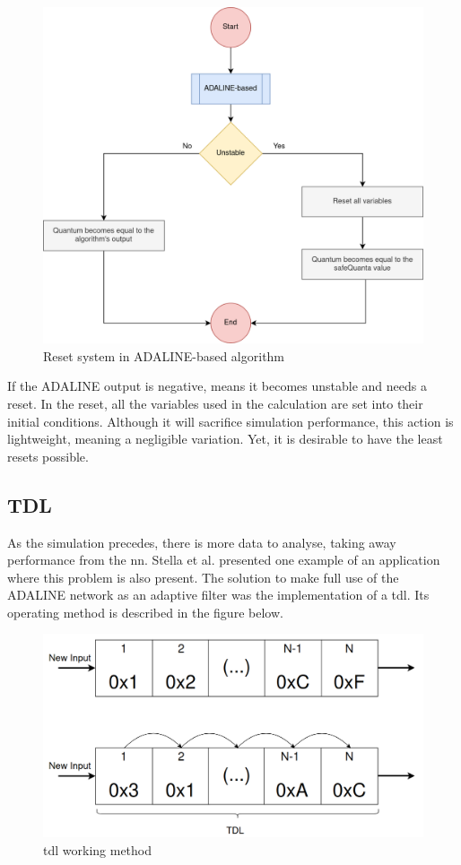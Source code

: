 \begin{figure}[H]
	\centering
 	\includegraphics[width=0.6\linewidth]{Images/ResetSystemADALINE.png}
 	\caption{Reset system in ADALINE-based algorithm}
	 \label{fig_ResetSystemADALINE}
\end{figure}

If the ADALINE output is negative, means it becomes unstable and needs a reset. In the reset, all the variables used in the calculation are set 
into their initial conditions. Although it will sacrifice simulation performance, this action is lightweight, meaning a negligible variation. 
Yet, it is desirable to have the least resets possible.

\subsection{TDL}

As the simulation precedes, there is more data to analyse, taking away performance from the \gls{nn}. Stella et al. \cite{noiseCancelingADALINE} 
presented one example of an application where this problem is also present. The solution to make full use of the ADALINE network as an adaptive 
filter was the implementation of a \gls{tdl}. Its operating method is described in the figure below. 

\begin{figure}[H]
	\centering
 	\includegraphics[width=0.5\linewidth]{Images/TDL.png}
 	\caption{\gls{tdl} working method}
	 \label{fig_TDL}
\end{figure}

